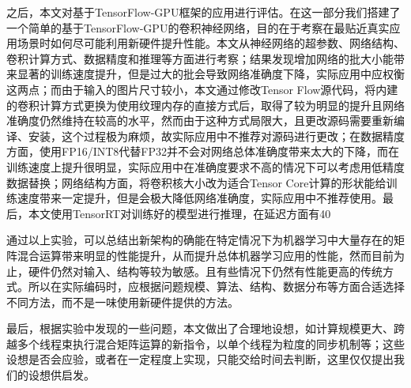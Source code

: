 \par 之后，本文对基于TensorFlow-GPU框架的应用进行评估。在这一部分我们搭建了一个简单的基于TensorFlow-GPU的卷积神经网络，目的在于考察在最贴近真实应用场景时如何尽可能利用新硬件提升性能。本文从神经网络的超参数、网络结构、卷积计算方式、数据精度和推理等方面进行考察；结果发现增加网络的批大小能带来显著的训练速度提升，但是过大的批会导致网络准确度下降，实际应用中应权衡这两点；而由于输入的图片尺寸较小，本文通过修改Tensor Flow源代码，将内建的卷积计算方式更换为使用纹理内存的直接方式后，取得了较为明显的提升且网络准确度仍然维持在较高的水平，然而由于这种方式局限大，且更改源码需要重新编译、安装，这个过程极为麻烦，故实际应用中不推荐对源码进行更改；在数据精度方面，使用FP16/INT8代替FP32并不会对网络总体准确度带来太大的下降，而在训练速度上提升很明显，实际应用中在准确度要求不高的情况下可以考虑用低精度数据替换；网络结构方面，将卷积核大小改为适合Tensor Core计算的形状能给训练速度带来一定提升，但是会极大降低网络准确度，实际应用中不推荐使用。最后，本文使用TensorRT对训练好的模型进行推理，在延迟方面有40%
\par 通过以上实验，可以总结出新架构的确能在特定情况下为机器学习中大量存在的矩阵混合运算带来明显的性能提升，从而提升总体机器学习应用的性能，然而目前为止，硬件仍然对输入、结构等较为敏感。且有些情况下仍然有性能更高的传统方式。所以在实际编码时，应根据问题规模、算法、结构、数据分布等方面合适选择不同方法，而不是一味使用新硬件提供的方法。
\par 最后，根据实验中发现的一些问题，本文做出了合理地设想，如计算规模更大、跨越多个线程束执行混合矩阵运算的新指令，以单个线程为粒度的同步机制等；这些设想是否会应验，或者在一定程度上实现，只能交给时间去判断，这里仅仅提出我们的设想供启发。
